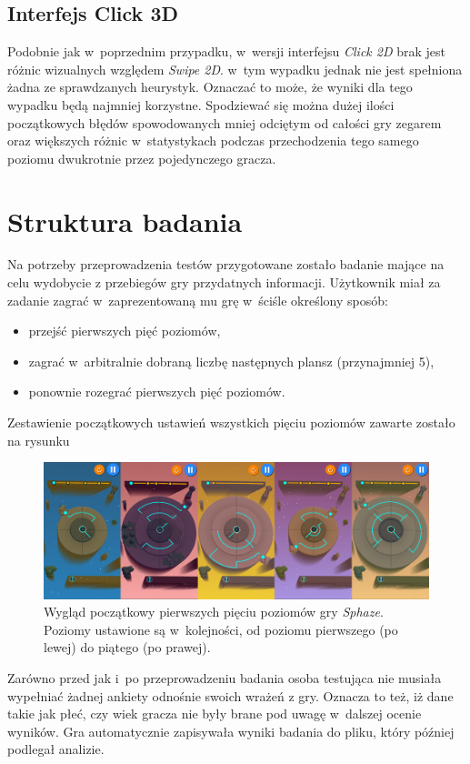 \documentclass[a4paper,12pt,numbers=noenddot]{report}
\begin{document}
\subsection{Interfejs Click 3D}
Podobnie jak w~poprzednim przypadku, w~wersji interfejsu \textit{Click 2D} brak jest różnic wizualnych względem \textit{Swipe 2D}. w~tym wypadku jednak nie jest spełniona żadna ze sprawdzanych heurystyk. Oznaczać to może, że wyniki dla tego wypadku będą najmniej korzystne. Spodziewać się można dużej ilości początkowych błędów spowodowanych mniej odciętym od całości gry zegarem oraz większych różnic w~statystykach podczas przechodzenia tego samego poziomu dwukrotnie przez pojedynczego gracza.
\section{Struktura badania}
Na potrzeby przeprowadzenia testów przygotowane zostało badanie mające na celu wydobycie z przebiegów gry przydatnych informacji. 
Użytkownik miał za zadanie zagrać w~zaprezentowaną mu grę w~ściśle określony sposób:
\begin{itemize}
\item przejść pierwszych pięć poziomów,
\item zagrać w~arbitralnie dobraną liczbę następnych plansz (przynajmniej 5),
\item ponownie rozegrać pierwszych pięć poziomów.
\end{itemize}

Zestawienie początkowych ustawień wszystkich pięciu poziomów zawarte zostało na rysunku 
\begin{figure}[h!]
	\centering
  	\includegraphics[width=\linewidth]{fig/all_levels.jpg}
	\caption{Wygląd początkowy pierwszych pięciu poziomów gry \textit{Sphaze}. Poziomy ustawione są w~kolejności, od poziomu pierwszego (po lewej) do piątego (po prawej).}
	\label{fig:all_levels}
\end{figure}
Zarówno przed jak i~po przeprowadzeniu badania osoba testująca nie musiała wypełniać żadnej ankiety odnośnie swoich wrażeń z gry. Oznacza to też, iż dane takie jak płeć, czy wiek gracza nie były brane pod uwagę w~dalszej ocenie wyników. Gra automatycznie zapisywała wyniki badania do pliku, który później podlegał analizie.
\end{document}
